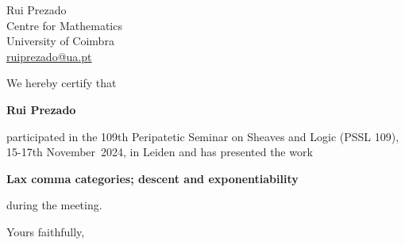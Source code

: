 \documentclass[
  fontsize=11pt,
  paper=a4,
  parskip=half,
  enlargefirstpage=on,    %
  fromalign=right,        %
  fromlogo=on,
  fromrule=off,     %
  addrfield=on,           %
  backaddress=off,         %
  subject=beforeopening,  %
  locfield=off,        %
  foldmarks=off,           %
  pagenumber=off
]{scrlttr2}
\begin{document}
\begin{letter}{%
    Rui Prezado \\
    Centre for Mathematics \\
    University of Coimbra \\
    \url{ruiprezado@ua.pt}
  }
  \opening{}

  We hereby certify that
  \begin{center}
    \textbf{Rui Prezado}
  \end{center}
  participated in the 109th Peripatetic Seminar on Sheaves and Logic
  (PSSL 109), 15-17th November~2024, in Leiden and has 
  presented the work
  \begin{center}
    \textbf{Lax comma categories; descent and exponentiability}
  \end{center}
  during the meeting.

\vfill
\closing{Yours faithfully,}
\end{letter}
\end{document}

